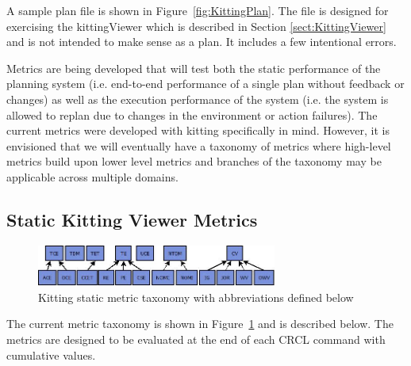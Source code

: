 A sample plan file is shown in Figure~\ref{fig:KittingPlan}. The file is
designed for exercising the kittingViewer which is described in Section \ref{sect:KittingViewer}
and is not intended to make sense
as a plan. It includes a few intentional errors.

Metrics are being developed that will test both the static performance of the planning system
(i.e. end-to-end performance of a single plan without feedback or changes) as well as the
execution performance of the system (i.e. the system is allowed to replan due to changes
in the environment or action failures). The current metrics were developed with
kitting specifically in mind. However, it is envisioned that we will eventually have
a taxonomy of metrics where high-level metrics build upon lower level metrics and
branches of the taxonomy may be applicable across multiple domains.

\subsection{Static Kitting Viewer Metrics}
\begin{figure}[ht!]
		\begin{center}
			\includegraphics[width=3.1in]{images/MetricTaxonomy.jpg}
		\end{center}

	\caption{Kitting static metric taxonomy with abbreviations defined below}
	\label{fig:StaticMetricTax}
\end{figure}

The current metric taxonomy is shown in Figure~\ref{fig:StaticMetricTax} and is
described below. The metrics are designed to be evaluated at the end of each
CRCL command with cumulative values.

